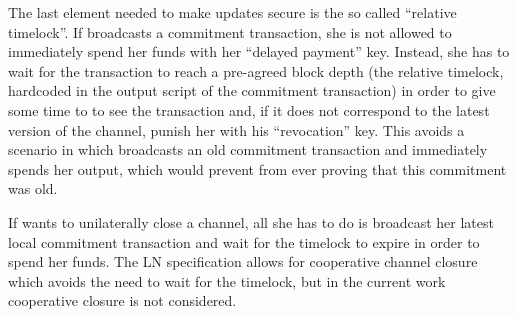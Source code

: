   The last element needed to make updates secure is the so called ``relative
  timelock''. If \alice{} broadcasts a commitment transaction, she is not
  allowed to immediately spend her funds with her ``delayed payment'' key.
  Instead, she has to wait for the transaction to reach a pre-agreed block depth
  (the relative timelock, hardcoded in the output script of the commitment
  transaction) in order to give some time to \bob{} to see the transaction and,
  if it does not correspond to the latest version of the channel, punish her
  with his ``revocation'' key. This avoids a scenario in which \alice{}
  broadcasts an old commitment transaction and immediately spends her output,
  which would prevent \bob{} from ever proving that this commitment was old.

  If \alice{} wants to unilaterally close a channel, all she has to do is
  broadcast her latest local commitment transaction and wait for the timelock to
  expire in order to spend her funds. The LN specification allows for
  cooperative channel closure which avoids the need to wait for the timelock,
  but in the current work cooperative closure is not considered.
